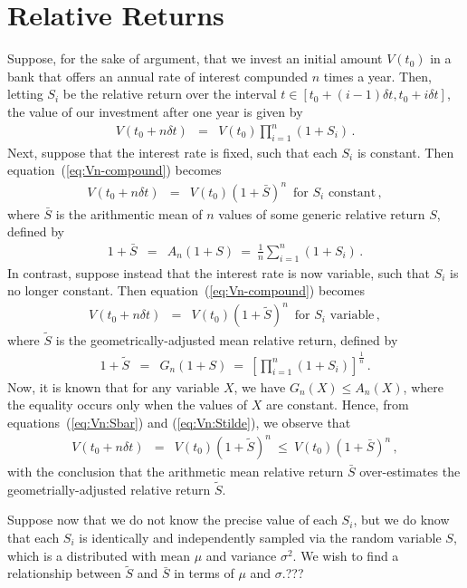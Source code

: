 \documentclass[a4paper]{book}
\begin{document}
\section{Relative Returns}
Suppose, for the sake of argument, that we invest an initial amount
$V(t_0)$ in a bank that offers an annual rate of interest compunded
$n$ times a year. Then, letting $S_i$ be the relative return
over the interval $t\in[t_0+(i-1)\delta t,t_0+i\delta t]$, the
value of our investment after one year is given by
\begin{eqnarray}
V(t_0+n\delta t) & = & V(t_0)\prod_{i=1}^{n}(1+S_i)\,.
\label{eq:Vn-compound}
\end{eqnarray}
Next, suppose that the interest rate is fixed, such that each 
$S_i$ is constant. Then equation~(\ref{eq:Vn-compound}) becomes
\begin{eqnarray}
V(t_0+n\delta t) & = & V(t_0)(1+\bar{S})^{n}
\,\,\,\mbox{for $S_i$ constant}\,,
\label{eq:Vn:Sbar}
\end{eqnarray}
where $\bar{S}$ is the arithmentic mean of
$n$ values of some generic relative return $S$, defined by
\begin{eqnarray}
1+\bar{S} & = & A_n(1+S)~=~\frac{1}{n}\sum_{i=1}^{n}(1+S_i)\,.
\end{eqnarray}
In contrast, suppose instead that the interest rate is now variable, 
such that $S_i$ is no longer constant.
Then equation~(\ref{eq:Vn-compound}) becomes
\begin{eqnarray}
V(t_0+n\delta t) & = & V(t_0)(1+\tilde{S})^{n}
\,\,\,\mbox{for $S_i$ variable}\,,
\label{eq:Vn:Stilde}
\end{eqnarray}
where $\tilde{S}$ is the geometrically-adjusted mean relative return,
defined by
\begin{eqnarray}
1+\tilde{S} & = & G_n(1+S)~=~
\left[\prod_{i=1}^{n}(1+S_i)\right]^{\frac{1}{n}}\,.
\label{eq:Gn:def}
\end{eqnarray}
Now, it is known that for any variable $X$, we have $G_n(X)\le A_n(X)$, where the
equality occurs only when the values of $X$ are constant.
Hence, from equations~(\ref{eq:Vn:Sbar}) and (\ref{eq:Vn:Stilde}),
we observe that
\begin{eqnarray}
V(t_0+n\delta t) & = & V(t_0)(1+\tilde{S})^{n}
~\le~V(t_0)(1+\bar{S})^{n}\,,
\end{eqnarray}
with the conclusion that the arithmetic mean relative return
$\bar{S}$ over-estimates the geometrially-adjusted relative return
$\tilde{S}$.

Suppose now that we do not know the precise value of each $S_i$, but
we do know that each $S_i$ is identically and independently sampled via
the random variable $S$, which is a  distributed with
mean $\mu$ and variance $\sigma^2$.
We wish to find a relationship between $\tilde{S}$ and $\bar{S}$
in terms of $\mu$ and $\sigma$.???
\end{document}
